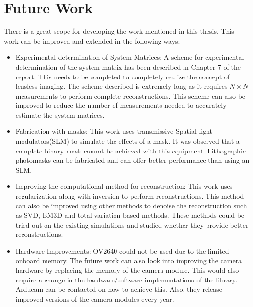 \section{Future Work}
There is a great scope for developing the work mentioned in this thesis. This work can be improved and extended in the following ways:
\begin{itemize}
\item Experimental determination of System Matrices: A scheme for experimental determination of the system matrix has been described in Chapter 7 of the report. This needs to be completed to completely realize the concept of lensless imaging. The scheme described is extremely long as it requires $N \times N$ measurements to perform complete reconstructions. This scheme can also be improved to reduce the number of measurements needed to accurately estimate the system matrices. 

\item Fabrication with masks: This work uses transmissive Spatial light modulators(SLM) to simulate the effects of a mask. It was observed that a complete binary mask cannot be achieved with this equipment. Lithographic photomasks can be fabricated and can offer better performance than using an SLM.

\item Improving the computational method for reconstruction: This work uses regularization along with inversion to perform reconstructions. This method can also be improved using other methods to denoise the reconstruction such as SVD, BM3D and total variation based methods\cite{Flatcam}. These methods could be tried out on the existing simulations and studied whether they provide better reconstructions.

\item Hardware Improvements: OV2640 could not be used due to the limited onboard memory. The future work can also look into improving the camera hardware by replacing the memory of the camera module. This would also require a change in the hardware/software implementations of the library. Arducam can be contacted on how to achieve this. Also, they release improved versions of the camera modules every year.
\end{itemize}

